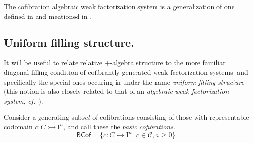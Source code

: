 \documentclass[11pt,reqno]{amsart}
\newcommand{\cf}{\emph{cf.}}
\newcommand{\mono}{\ensuremath{\rightarrowtail}}
\newcommand{\I}{\ensuremath{\mathrm{I}}}
\theoremstyle{remark}
\theoremstyle{definition}
\begin{document}
The cofibration algebraic weak factorization system is a generalization of one defined in \cite{bourke-garner-I} and mentioned in \cite{GS}.

\subsection*{Uniform filling structure.}

It will be useful to relate relative $+$-algebra structure to the more familiar diagonal filling condition of cofibrantly generated weak factorization systems, and specifically the special ones occuring in \cite{CCHM:2018ctt} under the name \emph{uniform filling structure} (this notion is also closely related to that of an \emph{algebraic weak factorization system}, \cf\ \cite{garner:small-object-argument,riehl-algebraic-model}).

Consider a generating sub\emph{set} of cofibrations consisting of those with representable codomain $c : C \mono \I^n$, and call these the \emph{basic cofibrations}.
\begin{equation}\label{eq:basiccof}
\mathsf{BCof} = \{c : C\mono \I^n\,|\ c\in \mathcal{C}, n\geq 0 \}.
\end{equation}
\end{document}
